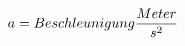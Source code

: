 \documentclass[preview]{standalone}
\begin{document}
\begin{align*}
\special{dvisvgm:raw <g id='unique000'>}a = Beschleunigung \frac{Meter}{s^{2}}\special{dvisvgm:raw </g>}
\end{align*}
\end{document}
